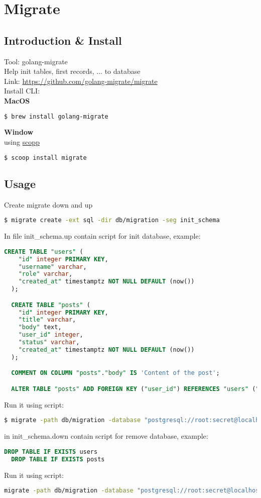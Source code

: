 \section{Migrate}
\subsection{Introduction \& Install}
Tool: golang-migrate \\
Help init tables, first records, ... to database \\
Link: \url{https://github.com/golang-migrate/migrate} \\
Install CLI: \\
\textbf{MacOS}
\begin{lstlisting}[language=bash]
  $ brew install golang-migrate
\end{lstlisting}
\textbf{Window} \\
using \href{https://scoop.sh/}{scopp}
\begin{lstlisting}[language=bash]
  $ scoop install migrate
\end{lstlisting}
\subsection{Usage}
Create migrate down and up
\begin{lstlisting}[language=bash]
  $ migrate create -ext sql -dir db/migration -seg init_schema
\end{lstlisting}

In file init\_schema.up contain script for init database, example:
\begin{lstlisting}[language=SQL]
  CREATE TABLE "users" (
    "id" integer PRIMARY KEY,
    "username" varchar,
    "role" varchar,
    "created_at" timestamptz NOT NULL DEFAULT (now())
  );

  CREATE TABLE "posts" (
    "id" integer PRIMARY KEY,
    "title" varchar,
    "body" text,
    "user_id" integer,
    "status" varchar,
    "created_at" timestamptz NOT NULL DEFAULT (now())
  );

  COMMENT ON COLUMN "posts"."body" IS 'Content of the post';

  ALTER TABLE "posts" ADD FOREIGN KEY ("user_id") REFERENCES "users" ("id");
\end{lstlisting}

Run it using script:
\begin{lstlisting}[language=bash]
  $ migrate -path db/migration -database "postgresql://root:secret@localhost:5432/the_post?sslmode=disable" -verbose up
\end{lstlisting}
in init\_schema.down contain script for remove database, example:
\begin{lstlisting}[language=SQL]
  DROP TABLE IF EXISTS users
  DROP TABLE IF EXISTS posts
\end{lstlisting}

Run it using script:
\begin{lstlisting}[language=bash]
  migrate -path db/migration -database "postgresql://root:secret@localhost:5432/the_post?sslmode=disable" -verbose down
\end{lstlisting}




